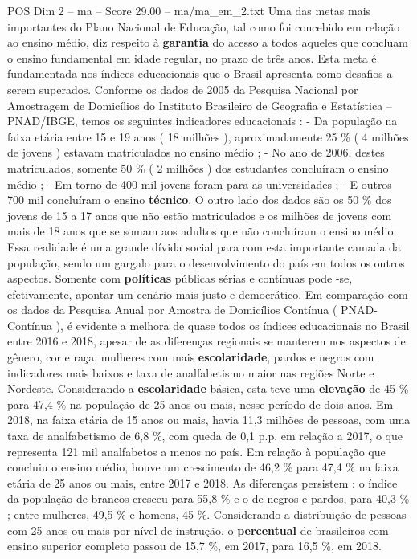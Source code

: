 \begin{textsample}{POS Dim 2 – ma – Score 29.00 – ma/ma\_em\_2.txt}
Uma das metas mais importantes do Plano Nacional de Educação, tal como foi concebido em relação ao ensino médio, diz respeito à \textbf{garantia} do acesso a todos aqueles que concluam o ensino fundamental em idade regular, no prazo de três anos.
Esta meta é fundamentada nos índices educacionais que o Brasil apresenta como desafios a serem superados.
Conforme os dados de 2005 da Pesquisa Nacional por Amostragem de Domicílios do Instituto Brasileiro de Geografia e Estatística – PNAD/IBGE, temos os seguintes indicadores educacionais : - Da população na faixa etária entre 15 e 19 anos ( 18 milhões ), aproximadamente 25 \% ( 4 milhões de jovens ) estavam matriculados no ensino médio ; - No ano de 2006, destes matriculados, somente 50 \% ( 2 milhões ) dos estudantes concluíram o ensino médio ; - Em torno de 400 mil jovens foram para as universidades ; - E outros 700 mil concluíram o ensino \textbf{técnico}.
O outro lado dos dados são os 50 \% dos jovens de 15 a 17 anos que não estão matriculados e os milhões de jovens com mais de 18 anos que se somam aos adultos que não concluíram o ensino médio.
Essa realidade é uma grande dívida social para com esta importante camada da população, sendo um gargalo para o desenvolvimento do país em todos os outros aspectos.
Somente com \textbf{políticas} públicas sérias e contínuas pode -se, efetivamente, apontar um cenário mais justo e democrático.
Em comparação com os dados da Pesquisa Anual por Amostra de Domicílios Contínua ( PNAD-Contínua ), é evidente a melhora de quase todos os índices educacionais no Brasil entre 2016 e 2018, apesar de as diferenças regionais se manterem nos aspectos de gênero, cor e raça, mulheres com mais \textbf{escolaridade}, pardos e negros com indicadores mais baixos e taxa de analfabetismo maior nas regiões Norte e Nordeste.
Considerando a \textbf{escolaridade} básica, esta teve uma \textbf{elevação} de 45 \% para 47,4 \% na população de 25 anos ou mais, nesse período de dois anos.
Em 2018, na faixa etária de 15 anos ou mais, havia 11,3 milhões de pessoas, com uma taxa de analfabetismo de 6,8 \%, com queda de 0,1 p.p. em relação a 2017, o que representa 121 mil analfabetos a menos no país.
Em relação à população que concluiu o ensino médio, houve um crescimento de 46,2 \% para 47,4 \% na faixa etária de 25 anos ou mais, entre 2017 e 2018.
As diferenças persistem : o índice da população de brancos cresceu para 55,8 \% e o de negros e pardos, para 40,3 \% ; entre mulheres, 49,5 \% e homens, 45 \%.
Considerando a distribuição de pessoas com 25 anos ou mais por nível de instrução, o \textbf{percentual} de brasileiros com ensino superior completo passou de 15,7 \%, em 2017, para 16,5 \%, em 2018.

\end{textsample}

